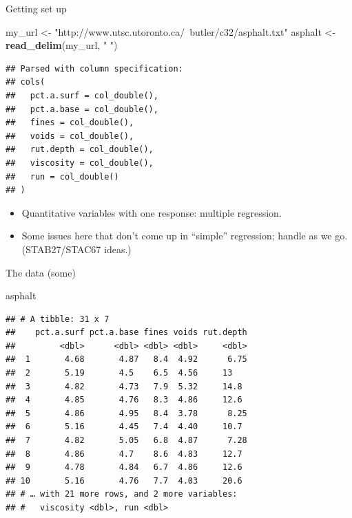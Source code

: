\documentclass[
  ignorenonframetext,
]{beamer}
\newenvironment{Shaded}{\begin{snugshade}}{\end{snugshade}}
\newcommand{\KeywordTok}[1]{\textcolor[rgb]{0.13,0.29,0.53}{\textbf{#1}}}
\newcommand{\NormalTok}[1]{#1}
\newcommand{\StringTok}[1]{\textcolor[rgb]{0.31,0.60,0.02}{#1}}
\providecommand{\tightlist}{%
  \setlength{\itemsep}{0pt}\setlength{\parskip}{0pt}}
\begin{document}
\begin{frame}[fragile]{Getting set up}
\protect\hypertarget{getting-set-up}{}

\begin{Shaded}
\begin{Highlighting}[]
\NormalTok{my_url <-}\StringTok{ "http://www.utsc.utoronto.ca/~butler/c32/asphalt.txt"}
\NormalTok{asphalt <-}\StringTok{ }\KeywordTok{read_delim}\NormalTok{(my_url, }\StringTok{" "}\NormalTok{)}
\end{Highlighting}
\end{Shaded}

\begin{verbatim}
## Parsed with column specification:
## cols(
##   pct.a.surf = col_double(),
##   pct.a.base = col_double(),
##   fines = col_double(),
##   voids = col_double(),
##   rut.depth = col_double(),
##   viscosity = col_double(),
##   run = col_double()
## )
\end{verbatim}

\begin{itemize}
\tightlist
\item
  Quantitative variables with one response: multiple regression.
\item
  Some issues here that don't come up in ``simple'' regression; handle
  as we go. (STAB27/STAC67 ideas.)
\end{itemize}

\end{frame}

\begin{frame}[fragile]{The data (some)}
\protect\hypertarget{the-data-some-3}{}

\begin{Shaded}
\begin{Highlighting}[]
\NormalTok{asphalt}
\end{Highlighting}
\end{Shaded}

\begin{verbatim}
## # A tibble: 31 x 7
##    pct.a.surf pct.a.base fines voids rut.depth
##         <dbl>      <dbl> <dbl> <dbl>     <dbl>
##  1       4.68       4.87   8.4  4.92      6.75
##  2       5.19       4.5    6.5  4.56     13   
##  3       4.82       4.73   7.9  5.32     14.8 
##  4       4.85       4.76   8.3  4.86     12.6 
##  5       4.86       4.95   8.4  3.78      8.25
##  6       5.16       4.45   7.4  4.40     10.7 
##  7       4.82       5.05   6.8  4.87      7.28
##  8       4.86       4.7    8.6  4.83     12.7 
##  9       4.78       4.84   6.7  4.86     12.6 
## 10       5.16       4.76   7.7  4.03     20.6 
## # … with 21 more rows, and 2 more variables:
## #   viscosity <dbl>, run <dbl>
\end{verbatim}

\end{frame}
\end{document}
